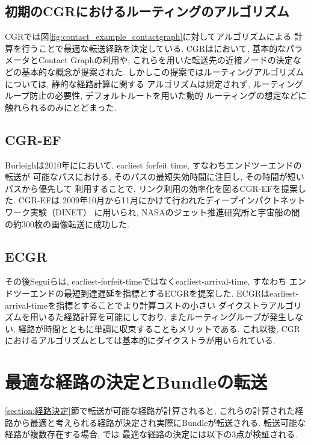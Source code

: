 \subsection{初期のCGRにおけるルーティングのアルゴリズム}
\label{section:宇宙インターネットにおけるルーティングのアルゴリズム}    
CGRでは図\ref{fig:contact_example_contactgraph}に対してアルゴリズムによる
計算を行うことで最適な転送経路を決定している.  
CGRは\cite{Burleigh2008}において, 基本的なパラメータとContact Graphの利用や, 
これらを用いた転送先の近接ノードの決定などの基本的な概念が提案された.  
しかしこの提案ではルーティングアルゴリズムについては, 静的な経路計算に関する
アルゴリズムは規定されず, ルーティングループ防止の必要性, デフォルトルートを用いた動的
ルーティングの想定などに触れられるのみにとどまった.  

\subsection{CGR-EF}
\label{section:CGR-EF}
Burleighは2010年に\cite{burleigh-dtnrg-cgr-01}において, 
earliest forfeit time, すなわちエンドツーエンドの転送が
可能なパスにおける, そのパスの最短失効時間に注目し, その時間が短いパスから優先して
利用することで, リンク利用の効率化を図るCGR-EFを提案した.  CGR-EFは
2009年10月から11月にかけて行われたディープインパクトネットワーク実験（DINET）
\cite{JPL2009}に用いられ, NASAのジェット推進研究所と宇宙船の間の約300枚の画像転送に成功した.  

\subsection{ECGR}
その後Seguiらは, earliest-forfeit-timeではなくearliest-arrival-time, すなわち
エンドツーエンドの最短到達遅延を指標とするECGRを提案した\cite{6134460}.  
ECGRはearliest-arrival-timeを指標とすることでより計算コストの小さい
ダイクストラアルゴリズムを用いるた経路計算を可能にしており, 
またルーティングループが発生しない, 経路が時間とともに単調に収束することもメリットである.  
これ以後, CGRにおけるアルゴリズムとしては基本的にダイクストラが用いられている.  

\section{最適な経路の決定とBundleの転送}
\label{section:Bundleの転送}

\ref{section:経路決定}節で転送が可能な経路が計算されると, 
これらの計算された経路から最適と考えられる経路が決定され実際にBundleが転送される.  
転送可能な経路が複数存在する場合, \cite{schedule_aware_bundle_routing}では
最適な経路の決定には以下の3点が検証される.  

